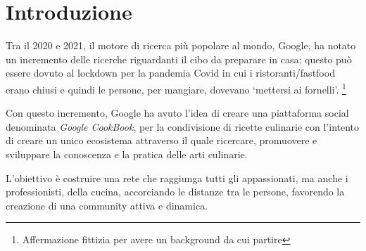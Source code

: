 \chapter*{Introduzione}

Tra il 2020 e 2021, il motore di ricerca più popolare al mondo, Google, 
ha notato un incremento delle ricerche riguardanti il cibo da preparare in casa; 
questo può essere dovuto al lockdown per la pandemia Covid in cui i 
ristoranti/fastfood erano chiusi e quindi le persone, per mangiare, 
dovevano `mettersi ai fornelli'. 
\footnote{Affermazione fittizia per avere un background da cui partire}

Con questo incremento, Google ha avuto l'idea di creare una piattaforma social denominata 
\textit{Google CookBook}, per la condivisione di ricette culinarie con l'intento di 
creare un unico ecosistema attraverso il quale ricercare, promuovere e sviluppare 
la conoscenza e la pratica delle arti culinarie.

L'obiettivo è costruire una rete che raggiunga tutti gli appassionati, ma anche i 
professionisti, della cucina, accorciando le distanze tra le persone, favorendo la 
creazione di una community attiva e dinamica.
